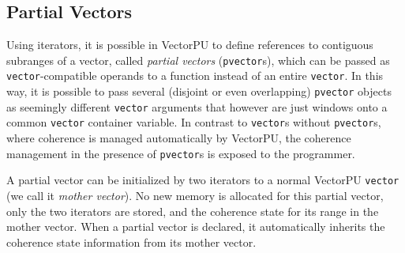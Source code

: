 




\subsection{Partial Vectors}
\label{sec:Partial Vectors}


Using iterators, it is possible in VectorPU to define references to
contiguous subranges of a vector,
called \textit{partial vectors} (\texttt{pvector}s), 
which can be passed as \texttt{vector}-compatible
operands to a function instead of an entire \texttt{vector}.
In this way, it is possible to pass several (disjoint or even
overlapping) \texttt{pvector} objects as seemingly different \texttt{vector}
arguments that however are just windows onto
a common \texttt{vector} container variable. 
In contrast to \texttt{vector}s without \texttt{pvector}s, where coherence is 
managed automatically by VectorPU, the coherence 
management in the presence of \texttt{pvector}s 
is exposed to the programmer.

A partial vector can be initialized by two iterators to a normal VectorPU \texttt{vector} (we call it \emph{mother vector}).
No new memory is allocated for this partial vector, 
only the two iterators are stored, 
and the coherence state for its range in the mother vector.
When a partial vector is declared, it automatically
inherits the coherence state information
from its mother vector. 

